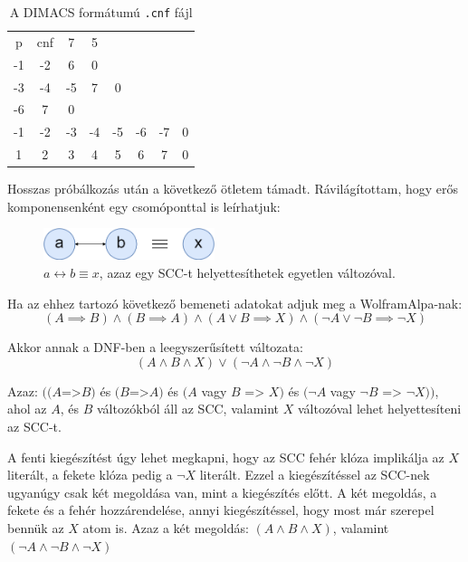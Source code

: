 \documentclass[
]{thesis-ekf}
\theoremstyle{definition}
\theoremstyle{remark}
\begin{document}
	\begin{table}[!ht]
		\centering
		\begin{tabular}{cccccccc}
		p & cnf & 7 & 5 & & & &  \\
		-1&-2& 6& 0&  &  &  &  \\
		-3&-4&-5& 7& 0&  &  &  \\
		-6& 7& 0&  &  &  &  &  \\
		-1&-2&-3&-4&-5&-6&-7& 0 \\
		1& 2& 3& 4& 5& 6& 7& 0 \\
		\end{tabular}
		\caption{\label{table-esm-cnf}A \textsc{DIMACS} formátumú \texttt{.cnf} fájl}
	\end{table}
	
	Hosszas próbálkozás után a következő ötletem támadt. Rávilágítottam, hogy erős komponensenként egy csomóponttal is leírhatjuk:
	
	\begin{figure}[!ht]
		\centering
		\includegraphics[width=5cm]{images/sajat_pelda}
		\caption{$ a\leftrightarrow b\equiv x$, azaz egy \textsc{SCC}-t helyettesíthetek egyetlen változóval.}
		\label{abra-sajatpelda-ab-x}
	\end{figure}
	
	Ha az ehhez tartozó következő bemeneti adatokat adjuk meg a WolframAlpa-nak:
	\[ (A\implies B)\wedge(B\implies A)\wedge(A\vee B \implies X)\wedge(\neg A\vee\neg B\implies\neg X) \]

	Akkor annak a \textsc{DNF}-ben a leegyszerűsített változata:
	\[ (A\wedge B\wedge X)\vee(\neg A\wedge\neg B\wedge\neg X) \]

	Azaz: $((A$=>$B)$ és $(B$=>$A)$ és $(A$ vagy $B$ => $X)$ és $( \neg A $ vagy $ \neg B $ => $ \neg X ))$, ahol az $A$, és $B$ változókból áll az \textsc{SCC}, valamint $X$ változóval lehet helyettesíteni az \textsc{SCC}-t.
	
	A fenti kiegészítést úgy lehet megkapni, hogy az \textsc{SCC} fehér klóza implikálja az $ X $ literált, a fekete klóza pedig a $ \neg X $ literált. Ezzel a kiegészítéssel az \textsc{SCC}-nek ugyanúgy csak két megoldása van, mint a kiegészítés előtt. A két megoldás, a fekete és a fehér hozzárendelése, annyi kiegészítéssel, hogy most már szerepel bennük az $X$ atom is. Azaz a két megoldás: $ (A \wedge B \wedge X) $, valamint $ (\neg A \wedge \neg B \wedge \neg X) $
	
\end{document}
